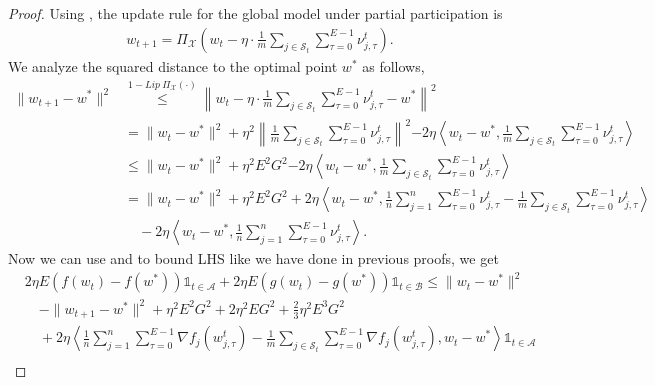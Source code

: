 \documentclass{article} %
\def\A{{\mathcal A}}
\def\B{{\mathcal B}}
\def\S{{\mathcal S}}
\begin{document}
\begin{proof}
    Using , the update rule for the global model under partial participation is
    \begin{align}
    w_{t+1} = \Pi_\mathcal{X}\left(w_t - \eta \cdot \frac{1}{m} \sum_{j\in \S_t} \sum_{\tau=0}^{E-1} \nu_{j,\tau}^t\right).
    \end{align}
    We analyze the squared distance to the optimal point \( w^* \) as follows,
        \begin{align*}
        \|w_{t+1} - w^*\|^2 
        &\overset{1-Lip\ \Pi_\mathcal{X}(\cdot)}{\leq} \left\| w_t - \eta \cdot \frac{1}{m} \sum_{j \in \S_t}\sum_{\tau=0}^{E-1} \nu_{j,\tau}^t - w^* \right\|^2 \\
        &= \|w_t - w^*\|^2 + {\eta^2 \left\| \frac{1}{m} \sum_{j \in \S_t}  \sum_{\tau=0}^{E-1} \nu_{j,\tau}^t \right\|^2}
         {- 2\eta \left\langle w_t - w^*, \frac{1}{m} \sum_{j \in \S_t} \sum_{\tau=0}^{E-1} \nu_{j,\tau}^t \right\rangle}
         \\
         & \leq \|w_t - w^*\|^2 + \eta^2 E^2G^2
         {- 2\eta \left\langle w_t - w^*, \frac{1}{m} \sum_{j \in \S_t} \sum_{\tau=0}^{E-1} \nu_{j,\tau}^t \right\rangle}
         \\
         & = \|w_t - w^*\|^2 + \eta^2 E^2G^2
         + 2\eta \left\langle w_t - w^*, \frac{1}{n} \sum_{j =1}^{n} \sum_{\tau=0}^{E-1} \nu_{j,\tau}^t -  \frac{1}{m} \sum_{j \in \S_t} \sum_{\tau=0}^{E-1} \nu_{j,\tau}^t \right\rangle
         \\
         & \quad - 2\eta \left\langle w_t - w^*, \frac{1}{n} \sum_{j =1}^{n} \sum_{\tau=0}^{E-1} \nu_{j,\tau}^t \right\rangle.
    \end{align*}
    Now we can use  and  to bound LHS like we have done in previous proofs, we get
    \begin{equation*}
    \begin{aligned}
        &2\eta E(f(w_t) - f(w^*) )\mathds{1}_{t \in \A} + 2\eta E(g(w_t) - g(w^*))\mathds{1}_{t \in \B} \leq \|w_t - w^*\|^2 
        \\
        & \quad - \|w_{t+1} - w^*\|^2 + \eta^2E^2G^2 + 2\eta^2EG^2 + \frac{2}{3}\eta^2 E^3G^2 
        \\
        &\quad + 2\eta \left\langle \frac{1}{n} \sum_{j=1}^{n} \sum_{\tau=0}^{E-1} \nabla f_j(w_{j,\tau}^t) 
        - \frac{1}{m} \sum_{j \in \S_t} \sum_{\tau=0}^{E-1} \nabla f_j(w_{j,\tau}^t), w_t - w^* \right\rangle \mathds{1}_{t \in \A} \\

\end{aligned}
\end{equation*}
\end{proof}
\end{document}
